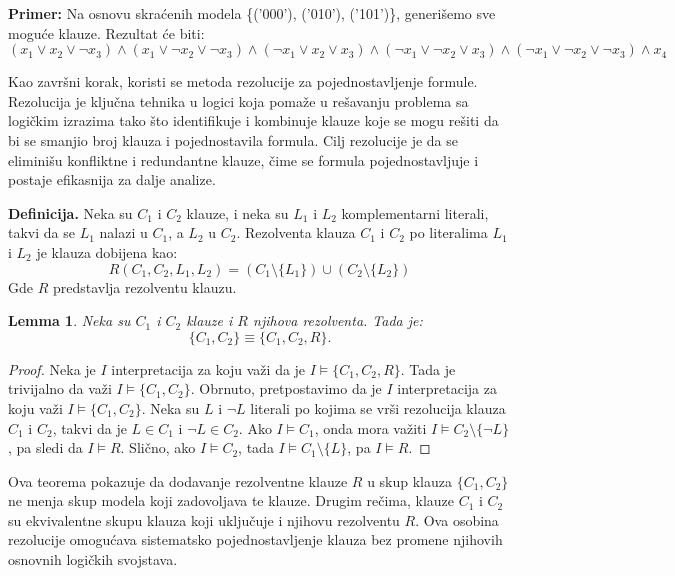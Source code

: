 \documentclass[12pt,oneside]{memoir}
\newtheorem{lemma}[theorem]{Lemma}
\begin{document}
\textbf{Primer:} Na osnovu skraćenih modela \{('000'), ('010'), ('101')\}, generišemo sve moguće klauze. Rezultat će biti:
\[
(x_1 \vee x_2 \vee \neg x_3) \wedge (x_1 \vee \neg x_2 \vee \neg x_3) \wedge (\neg x_1 \vee x_2 \vee x_3) \wedge (\neg x_1 \vee \neg x_2 \vee x_3) \wedge (\neg x_1 \vee \neg x_2 \vee \neg x_3) \wedge x_4
\]

Kao završni korak, koristi se metoda rezolucije za pojednostavljenje formule. Rezolucija je ključna tehnika u logici koja pomaže u rešavanju problema sa logičkim izrazima tako što identifikuje i kombinuje klauze koje se mogu rešiti da bi se smanjio broj klauza i pojednostavila formula. Cilj rezolucije je da se eliminišu konfliktne i redundantne klauze, čime se formula pojednostavljuje i postaje efikasnija za dalje analize.

\textbf{Definicija.} Neka su \( C_1 \) i \( C_2 \) klauze, i neka su \( L_1 \) i \( L_2 \) komplementarni literali, takvi da se \( L_1 \) nalazi u \( C_1 \), a \( L_2 \) u \( C_2 \). Rezolventa klauza \( C_1 \) i \( C_2 \) po literalima \( L_1 \) i \( L_2 \) je klauza dobijena kao:
\[
R(C_1, C_2, L_1, L_2) = \left(C_1 \setminus \{L_1\}\right) \cup \left(C_2 \setminus \{L_2\}\right)
\]
Gde \( R \) predstavlja rezolventu klauzu.\\


\begin{lemma}
Neka su \( C_1 \) i \( C_2 \) klauze i \( R \) njihova rezolventa. Tada je:
\[
\{C_1, C_2\} \equiv \{C_1, C_2, R\}
\text{.}
\]
\end{lemma}

\begin{proof}
Neka je $I$ interpretacija za koju važi da je $I \models \{C_1, C_2, R\}$. Tada je trivijalno da važi $I \models \{C_1, C_2\}$. Obrnuto, pretpostavimo da je $I$ interpretacija za koju važi $I \models \{C_1, C_2\}$. Neka su $L$ i $\neg L$ literali po kojima se vrši rezolucija klauza $C_1$ i $C_2$, takvi da je $L \in C_1$ i $\neg L \in C_2$. Ako $I \models C_1$, onda mora važiti $I \models C_2 \setminus \{\neg L\}$, pa sledi da $I \models R$. Slično, ako $I \models C_2$, tada $I \models C_1 \setminus \{L\}$, pa $I \models R$.

\end{proof}
Ova teorema pokazuje da dodavanje rezolventne klauze \( R \) u skup klauza \( \{C_1, C_2\} \) ne menja skup modela koji zadovoljava te klauze. Drugim rečima, klauze \( C_1 \) i \( C_2 \) su ekvivalentne skupu klauza koji uključuje i njihovu rezolventu \( R \). Ova osobina rezolucije omogućava sistematsko pojednostavljenje klauza bez promene njihovih osnovnih logičkih svojstava.
\end{document}
